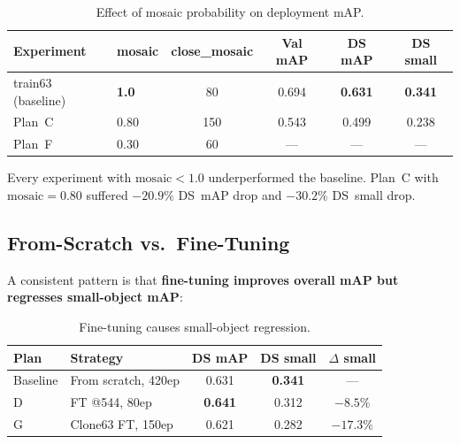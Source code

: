 \documentclass[12pt, titlepage]{article}
\begin{document}
\begin{table}[H]
  \centering
  \caption{Effect of mosaic probability on deployment mAP.}
  \label{tab:mosaic_ablation}
  \small
  \begin{tabular}{@{}llcccc@{}}
    \toprule
    \textbf{Experiment} & \textbf{mosaic} & \textbf{close\_mosaic} &
    \textbf{Val mAP}    & \textbf{DS mAP} & \textbf{DS small}        \\
    \midrule
    train63 (baseline)  & \textbf{1.0}    & 80                     &
    0.694               & \textbf{0.631}  & \textbf{0.341}           \\
    Plan~C              & 0.80            & 150                    &
    0.543               & 0.499           & 0.238                    \\
    Plan~F              & 0.30            & 60                     &
    ---                 & ---             & ---                      \\
    \bottomrule
  \end{tabular}
\end{table}

Every experiment with $\text{mosaic} < 1.0$ underperformed the baseline. Plan~C
with $\text{mosaic} = 0.80$ suffered $-20.9\%$ DS~mAP drop and $-30.2\%$
DS~small drop.

\subsection{From-Scratch vs.\ Fine-Tuning}
\label{sec:ft_vs_scratch}

A consistent pattern is that \textbf{fine-tuning improves overall mAP but
  regresses small-object mAP}:

\begin{table}[H]
  \centering
  \caption{Fine-tuning causes small-object regression.}
  \label{tab:ft_regression}
  \begin{tabular}{@{}llccc@{}}
    \toprule
    \textbf{Plan}     & \textbf{Strategy}       & \textbf{DS mAP} &
    \textbf{DS small} & \textbf{$\Delta$ small}                     \\
    \midrule
    Baseline          & From scratch, 420ep     & 0.631           &
    \textbf{0.341}    & ---                                         \\
    D                 & FT @544, 80ep           & \textbf{0.641}  &
    0.312             & $-8.5\%$                                    \\
    G                 & Clone63 FT, 150ep       & 0.621           &
    0.282             & $-17.3\%$                                   \\
    \bottomrule
  \end{tabular}
\end{table}
\end{document}

